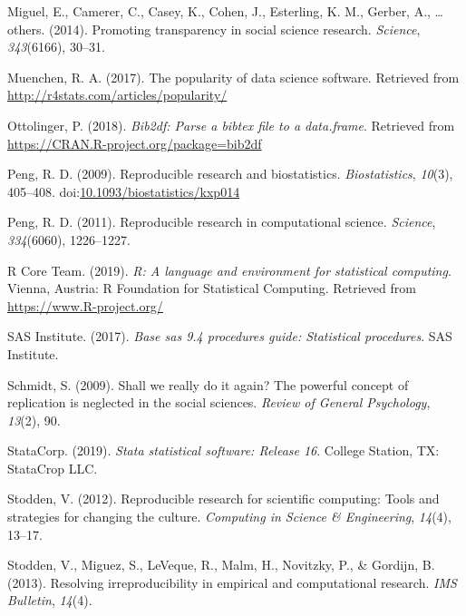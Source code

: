 \documentclass[english,,man]{apa6}
\begin{document}
\leavevmode\hypertarget{ref-miguel2014}{}%
Miguel, E., Camerer, C., Casey, K., Cohen, J., Esterling, K. M., Gerber, A., \ldots{} others. (2014). Promoting transparency in social science research. \emph{Science}, \emph{343}(6166), 30--31.

\leavevmode\hypertarget{ref-muenchen}{}%
Muenchen, R. A. (2017). The popularity of data science software. Retrieved from \url{http://r4stats.com/articles/popularity/}

\leavevmode\hypertarget{ref-bib2df}{}%
Ottolinger, P. (2018). \emph{Bib2df: Parse a bibtex file to a data.frame}. Retrieved from \url{https://CRAN.R-project.org/package=bib2df}

\leavevmode\hypertarget{ref-peng2009}{}%
Peng, R. D. (2009). Reproducible research and biostatistics. \emph{Biostatistics}, \emph{10}(3), 405--408. doi:\href{https://doi.org/10.1093/biostatistics/kxp014}{10.1093/biostatistics/kxp014}

\leavevmode\hypertarget{ref-peng2011}{}%
Peng, R. D. (2011). Reproducible research in computational science. \emph{Science}, \emph{334}(6060), 1226--1227.

\leavevmode\hypertarget{ref-rpro}{}%
R Core Team. (2019). \emph{R: A language and environment for statistical computing}. Vienna, Austria: R Foundation for Statistical Computing. Retrieved from \url{https://www.R-project.org/}

\leavevmode\hypertarget{ref-sas2017base}{}%
SAS Institute. (2017). \emph{Base sas 9.4 procedures guide: Statistical procedures}. SAS Institute.

\leavevmode\hypertarget{ref-schmidt2009}{}%
Schmidt, S. (2009). Shall we really do it again? The powerful concept of replication is neglected in the social sciences. \emph{Review of General Psychology}, \emph{13}(2), 90.

\leavevmode\hypertarget{ref-stata}{}%
StataCorp. (2019). \emph{Stata statistical software: Release 16}. College Station, TX: StataCrop LLC.

\leavevmode\hypertarget{ref-stodden2012}{}%
Stodden, V. (2012). Reproducible research for scientific computing: Tools and strategies for changing the culture. \emph{Computing in Science \& Engineering}, \emph{14}(4), 13--17.

\leavevmode\hypertarget{ref-stodden2013}{}%
Stodden, V., Miguez, S., LeVeque, R., Malm, H., Novitzky, P., \& Gordijn, B. (2013). Resolving irreproducibility in empirical and computational research. \emph{IMS Bulletin}, \emph{14}(4).
\end{document}

